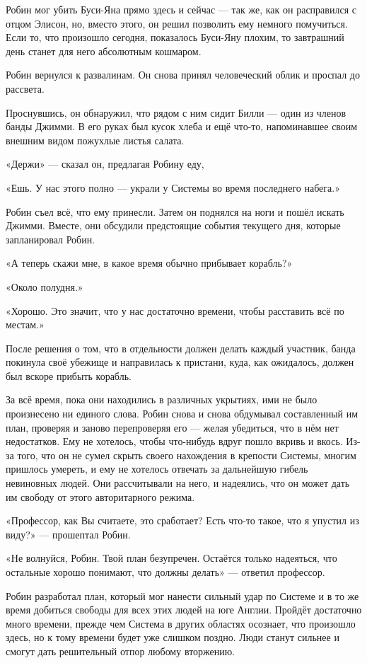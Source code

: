 \documentclass[a5paper, 9pt,
final, openany, twoside=true]{memoir}
\begin{document}
Робин мог убить Буси-Яна прямо здесь и сейчас — так же, как он расправился с отцом Элисон, но, вместо этого, он решил позволить ему немного помучиться. Если то, что произошло сегодня, показалось Буси-Яну плохим, то завтрашний день станет для него абсолютным кошмаром.\bigskip

Робин вернулся к развалинам. Он снова принял человеческий облик и проспал до рассвета.

Проснувшись, он обнаружил, что рядом с ним сидит Билли — один из членов банды Джимми. В его руках был кусок хлеба и ещё что-то, напоминавшее своим внешним видом пожухлые листья салата.

«Держи» — сказал он, предлагая Робину еду,

«Ешь. У нас этого полно — украли у Системы во время последнего набега.»

Робин съел всё, что ему принесли. Затем он поднялся на ноги и пошёл искать Джимми. Вместе, они обсудили предстоящие события текущего дня, которые запланировал Робин.

«А теперь скажи мне, в какое время обычно прибывает корабль?»

«Около полудня.»

«Хорошо. Это значит, что у нас достаточно времени, чтобы расставить всё по местам.»\bigskip

После решения о том, что в отдельности должен делать каждый участник, банда покинула своё убежище и направилась к пристани, куда, как ожидалось, должен был вскоре прибыть корабль.

За всё время, пока они находились в различных укрытиях, ими не было произнесено ни единого слова. Робин снова и снова обдумывал составленный им план, проверяя и заново перепроверяя его — желая убедиться, что в нём нет недостатков. Ему не хотелось, чтобы что-нибудь вдруг пошло вкривь и вкось. Из-за того, что он не сумел скрыть своего нахождения в крепости Системы, многим пришлось умереть, и ему не хотелось отвечать за дальнейшую гибель невиновных людей. Они рассчитывали на него, и надеялись, что он может дать им свободу от этого авторитарного режима.

«Профессор, как Вы считаете, это сработает? Есть что-то такое, что я упустил из виду?» — прошептал Робин.

«Не волнуйся, Робин. Твой план безупречен. Остаётся только надеяться, что остальные хорошо понимают, что должны делать» — ответил профессор.\bigskip

Робин разработал план, который мог нанести сильный удар по Системе и в то же время добиться свободы для всех этих людей на юге Англии. Пройдёт достаточно много времени, прежде чем Система в других областях осознает, что произошло здесь, но к тому времени будет уже слишком поздно. Люди станут сильнее и смогут дать решительный отпор любому вторжению.
\end{document}

